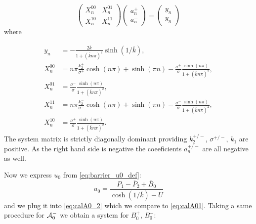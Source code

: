\documentclass[a4paper,10pt]{article}
\def\ol#1{\overline{#1}}
\begin{document}
\begin{equation}
    \label{eq:an_system}
    \begin{pmatrix} 
            X_n^{00} & X_n^{01} \\ 
            X_n^{10} & X_n^{11}
    \end{pmatrix}
    \begin{pmatrix} 
        a_n^+  \\ 
        a_n^-     
    \end{pmatrix}
     =  
    \begin{pmatrix} 
        y_n \\ 
        y_n
    \end{pmatrix}
\end{equation}
where
% 

\begin{align}
    y_n     &= -\frac{2 \ol{k}}{1+(\ol{k} n \pi)^2}\sinh(1/\ol{k}), \\
    X_n^{00}  &= n \pi \frac{k_2^+ }{\sigma^+}  \cosh(n \pi) 
              + \sinh(\pi n)  - \frac{\sigma^+ }{\ol{\sigma}}\frac{\sinh(n \pi)}{1 + (\ol{k} n \pi)^2}, \\
    X_n^{01}  &= \frac{\sigma^- }{\ol{\sigma}}\frac{\sinh(n \pi)}{1 + (\ol{k} n \pi)^2}, \\
    X_n^{11}  &= n \pi \frac{k_2^- }{\sigma^-}  \cosh(n \pi) 
              + \sinh(\pi n)  - \frac{\sigma^- }{\ol{\sigma}}\frac{\sinh(n \pi)}{1 + (\ol{k} n \pi)^2}, \\
    X_n^{10}  &= \frac{\sigma^+ }{\ol{\sigma}}\frac{\sinh(n \pi)}{1 + (\ol{k} n \pi)^2}. 
\end{align}
The system matrix is strictly diagonally dominant providing $k_2^{+/-}$, $\sigma^{+/-}$, $k_1$ are positive.
As the right hand side is negative the coeeficients $a_n^{+/-}$ are all negative as well.


Now we express $u_0$ from \eqref{eq:barrier_u0_def}:
\[
    u_0 = \frac{P_1 - \ol{P}_2 + \ol{B}_0}{\cosh(1/\ol{k}) - U}
\]
and we plug it into  \eqref{eq:calA0_2} which we compare to \eqref{eq:calA01}. Taking a same procedure for ${\cal A}_0^-$ we
obtain a system for $B_0^+$, $B_0^-$:
\end{document}
